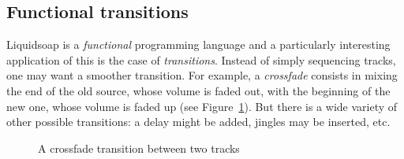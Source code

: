 \documentclass{llncs}
\newcommand{\liquidsoap}{Liquidsoap}
\newcommand{\TODO}[1]{\marginpar{\tiny #1}}
\newcommand{\fcaption}[1]{\vspace{-3ex}\caption{#1}\vspace{-4ex}}
\begin{document}
% 
% 

\subsection{Functional transitions}
\label{sec:transitions}

\liquidsoap{} is a \emph{functional} programming language and a particularly
interesting application of this is the case of \textit{transitions}.
Instead of simply sequencing tracks, one may want a smoother transition.
For example, a \emph{crossfade} consists in mixing the end of the old source,
whose volume is faded out, with the
beginning of the new one, whose volume is faded up (see Figure~\ref{fig:cross}).
But there is a wide variety of other possible transitions:
a delay might be added, jingles may be inserted, etc.

\begin{figure}[h]
 \begin{center}
\end{center}
 \fcaption{A crossfade transition between two tracks}
 \label{fig:cross}
\end{figure}
\end{document}

